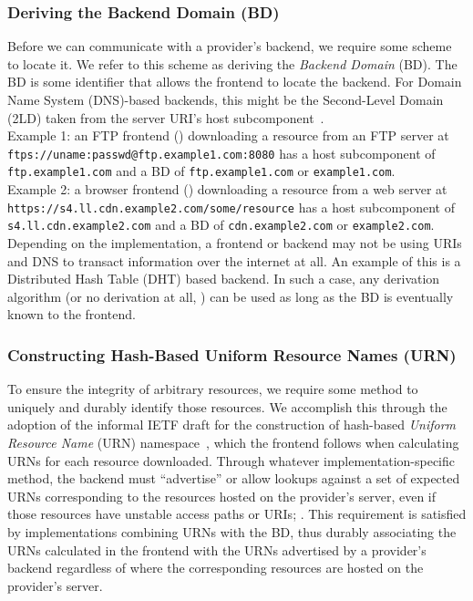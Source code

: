 \subsubsection{Deriving the Backend Domain (BD)}

Before we can communicate with a provider's backend, we require some scheme to
locate it. We refer to this scheme as deriving the \emph{Backend Domain} (BD).
The BD is some identifier that allows the frontend to locate the backend. For
Domain Name System (DNS)-based backends, this might be the Second-Level Domain
(2LD) taken from the server URI's host subcomponent~\cite{RFC3986}. \\

Example 1: an FTP frontend () downloading a resource from an FTP
server at \texttt{ftps://uname:passwd@ftp.example1.com:8080} has a host
subcomponent of \texttt{ftp.example1.com} and a BD of \texttt{ftp.example1.com}
or \texttt{example1.com}. \\

Example 2: a browser frontend ()
downloading a resource from a web server at
\texttt{https://s4.ll.cdn.example2.com/some/resource} has a host subcomponent of
\texttt{s4.ll.cdn.example2.com} and a BD of \texttt{cdn.example2.com} or
\texttt{example2.com}. \\

Depending on the implementation, a frontend or backend may not be using URIs and
DNS to transact information over the internet at all. An example of this is a
Distributed Hash Table (DHT) based backend. In such a case, any derivation
algorithm (or no derivation at all, ) can be used as
long as the BD is eventually known to the frontend.

\subsubsection{Constructing Hash-Based Uniform Resource Names (URN)}

To ensure the integrity of arbitrary resources, we require some method to
uniquely and durably identify those resources. We accomplish this through the
adoption of the informal IETF draft for the construction of hash-based
\emph{Uniform Resource Name} (URN) namespace~\cite{draft-URN}, which the
frontend follows when calculating URNs for each resource downloaded. Through
whatever implementation-specific method, the backend must ``advertise'' or allow
lookups against a set of expected URNs corresponding to the resources hosted on
the provider's server, even if those resources have unstable access paths or
URIs; . This requirement is satisfied by implementations combining URNs with
the BD, thus durably associating the URNs calculated in the frontend with the
URNs advertised by a provider's backend regardless of where the corresponding
resources are hosted on the provider's server.

